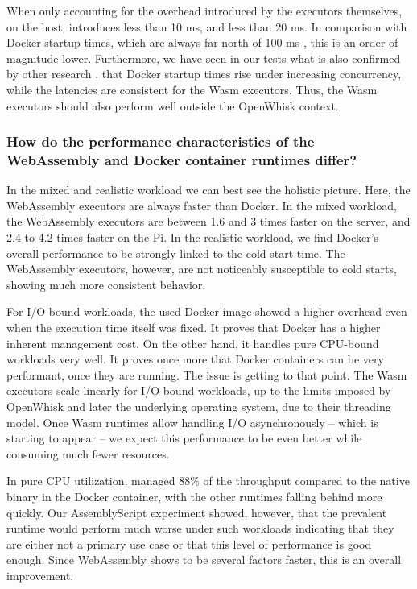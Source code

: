 When only accounting for the overhead introduced by the executors themselves, on the  host,  introduces less than 10 ms, and  less than 20 ms. In comparison with Docker startup times, which are always far north of 100 ms \cite{Wang2018, Manner2018}, this is an order of magnitude lower. Furthermore, we have seen in our tests what is also confirmed by other research \cite{Mohan2019}, that Docker startup times rise under increasing concurrency, while the latencies are consistent for the Wasm executors. Thus, the Wasm executors should also perform well outside the OpenWhisk context.

\subsubsection*{How do the performance characteristics of the WebAssembly and Docker container runtimes differ?}

In the mixed and realistic workload we can best see the holistic picture. Here, the WebAssembly executors are always faster than Docker. In the mixed workload, the WebAssembly executors are between 1.6 and 3 times faster on the server, and 2.4 to 4.2 times faster on the Pi. In the realistic workload, we find Docker's overall performance to be strongly linked to the cold start time. The WebAssembly executors, however, are not noticeably susceptible to cold starts, showing much more consistent behavior.

For I/O-bound workloads, the used Docker image showed a higher overhead even when the execution time itself was fixed. It proves that Docker has a higher inherent management cost. On the other hand, it handles pure CPU-bound workloads very well. It proves once more that Docker containers can be very performant, once they are running. The issue is getting to that point.
The Wasm executors scale linearly for I/O-bound workloads, up to the limits imposed by OpenWhisk and later the underlying operating system, due to their threading model. Once Wasm runtimes allow handling I/O asynchronously -- which is starting to appear -- we expect this performance to be even better while consuming much fewer resources.

In pure CPU utilization,  managed 88\% of the throughput compared to the native binary in the Docker container, with the other runtimes falling behind more quickly. Our AssemblyScript experiment showed, however, that the prevalent  runtime would perform much worse under such workloads indicating that they are either not a primary use case or that this level of performance is good enough. Since WebAssembly shows to be several factors faster, this is an overall improvement.

